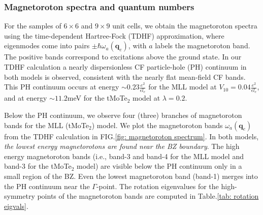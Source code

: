 \subsubsection{Magnetoroton spectra and quantum numbers}
For the samples of $6\times 6$ and $9\times9$ unit cells, we obtain the magnetoroton spectra using the time-dependent Hartree-Fock (TDHF) approximation, where eigenmodes come into pairs $\pm\hbar\omega_a(\mathbf q_e)$, with $a$ labels the magnetoroton band. The positive bands correspond to excitations above the ground state. In our TDHF calculation a nearly dispersionless CF particle-hole (PH) continuum in both models is observed, consistent with the nearly flat mean-field CF bands. This PH continuum occurs at energy $\sim 0.23 \frac{e^2}{\epsilon l_e}$ for the MLL model at $V_{10}=0.04 \frac{e^2}{\epsilon l_e}$, and at energy $\sim 11.2$meV for the tMoTe$_2$ model at $\lambda=0.2$. 

Below the PH continuum, we observe four (three) branches of magnetoroton bands for the MLL (tMoTe$_2$) model. We plot the magnetoroton bands $\omega_a(\mathbf q_e)$ from the TDHF calculation in FIG.\ref{fig: magnetoroton spectrum}. In both models, \emph{the lowest energy magnetorotons are found near the BZ boundary}. The high energy magnetoroton bands (i.e., band-3 and band-4 for the MLL model and band-3 for the tMoTe$_2$ model) are visible below the PH continuum only in a small region of the BZ. Even the lowest magnetoroton band (band-1) merges into the PH continuum near the $\Gamma$-point. The rotation eigenvalues for the high-symmetry points of the magnetoroton bands are computed in Table.\ref{tab: rotation eigvals}.


